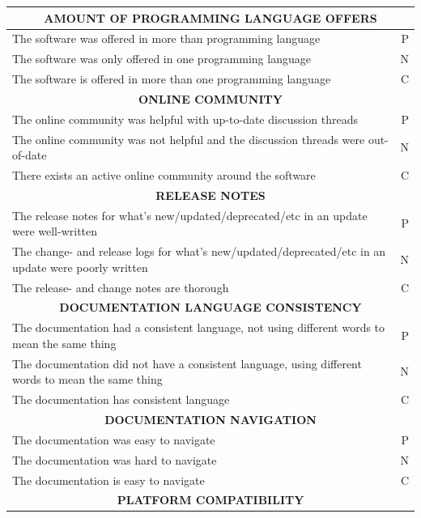 \documentclass{article}
\begin{document}
\begin{table}[H]
\centering
\begin{tabularx}{\columnwidth}{X r} \hline \hline
\multicolumn{2}{c}{\textbf{	AMOUNT OF PROGRAMMING LANGUAGE OFFERS	}} \\ \hline
The software was offered in more than programming language	&	P		\\ \hline
The software was only offered in one programming language	&	N		\\ \hline
The software is offered in more than one programming language	&	C		\\ \hline \hline
\multicolumn{2}{c}{\textbf{	ONLINE COMMUNITY	}} \\ \hline
The online community was helpful with up-to-date discussion threads	&	P		\\ \hline
The online community was not helpful and the discussion threads were out-of-date	&	N		\\ \hline
There exists an active online community around the software	&	C		\\ \hline \hline
\multicolumn{2}{c}{\textbf{	RELEASE NOTES	}} \\ \hline
The release notes for what's new/updated/deprecated/etc in an update were well-written	&	P		\\ \hline
The change- and release logs for what's new/updated/deprecated/etc in an update were poorly written	&	N		\\ \hline
The release- and change notes are thorough	&	C		\\ \hline \hline
\multicolumn{2}{c}{\textbf{	DOCUMENTATION LANGUAGE CONSISTENCY	}} \\ \hline
The documentation had a consistent language, not using different words to mean the same thing	&	P		\\ \hline
The documentation did not have a consistent language, using different words to mean the same thing	&	N		\\ \hline
The documentation has consistent language	&	C		\\ \hline \hline
\multicolumn{2}{c}{\textbf{	DOCUMENTATION NAVIGATION	}} \\ \hline
The documentation was easy to navigate	&	P		\\ \hline
The documentation was hard to navigate	&	N		\\ \hline
The documentation is easy to navigate	&	C		\\ \hline \hline
\multicolumn{2}{c}{\textbf{	PLATFORM COMPATIBILITY	}} \\ \hline

\end{tabularx}
\end{table}
\end{document}
